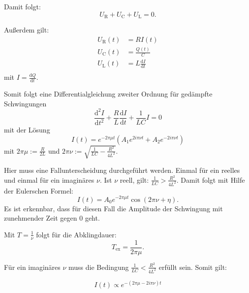 Damit folgt:
\begin{equation}
  U_{\mathrm R} + U_{\mathrm C} + U_{\mathrm L} = 0.
\end{equation}

Außerdem gilt:
\begin{align}
U_{\mathrm R}(t) &= R I(t) \\
U_{\mathrm C}(t) &= \frac{Q(t)}{C} \\
U_{\mathrm L}(t) &= L \frac{\mathrm{d}I}{\mathrm{d}t}\\
\end{align}
mit $I = \frac{\mathrm{d}Q}{\mathrm{d}t}$.

Somit folgt eine Differentialgleichung zweiter Ordnung für gedämpfte Schwingungen
\begin{equation}
  \label{eqn:dgl}
  \frac{\mathrm{d}^2 I}{\mathrm{d}t^2} + \frac{R}{L} \frac{\mathrm{d}I}{\mathrm{d}t} + \frac{1}{LC} I = 0
\end{equation}
 mit der Lösung
 \begin{equation}
   I(t) = e^{-2\pi \mu t}(A_{1} e^{2i\pi \nu t} + A_{2} e^{-2i\pi \nu t})
\end{equation}
mit $2\pi \mu := \frac{R}{2L}$ und $2\pi \nu := \sqrt{\frac{1}{LC} - \frac{R^2}{4L^2}}$.

Hier muss eine Fallunterscheidung durchgeführt werden. Einmal für ein reelles und einmal für ein imaginäres $\nu$.
Ist $\nu$ reell, gilt: $\frac{1}{LC} > \frac{R^2}{4L^2}$. Damit folgt mit Hilfe der Eulerschen Formel:
\begin{equation}
  \label{eqn:jfjfjfjf}
  I(t) = A_0 e^{-2\pi \mu t} \cos(2\pi\nu + \eta).
\end{equation}
Es ist erkennbar, dass für diesen Fall die Amplitude der Schwingung mit zunehmender Zeit gegen 0 geht.

Mit $T = \frac{1}{\nu}$ folgt für die Abklingdauer:
\begin{equation}
  T_{\mathrm{ex}} = \frac{1}{2\pi\mu}.
\end{equation}


Für ein imaginäres $\nu$ muss die Bedingung $\frac{1}{LC} < \frac{R^2}{4L^2}$ erfüllt sein.
Somit gilt:

\begin{equation}
  I(t) \propto e^{-(2\pi\mu -2i\pi\nu)t}
\end{equation}

